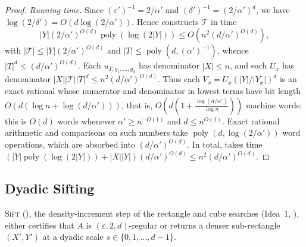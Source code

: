 \documentclass[11pt]{article}
\theoremstyle{definition}
\renewcommand{\label}[1]{}%
\newcommand{\poly}{\operatorname{poly}}
\newcommand{\abs}[1]{\left\lvert #1 \right\rvert}
\newcommand{\Sift}{\textnormal{\textsc{Sift}}}
\begin{document}
\begin{proof}
\emph{Running time.} Since $(\varepsilon')^{-1} = 2/\alpha'$ and $(\delta')^{-1} = (2/\alpha')^d$, we have $\log(2/\delta') = O(d\log(2/\alpha'))$. Hence  constructs $\mathcal{T}$ in time
\[
    \abs{Y}(2/\alpha')^{O(d)}\poly(\log(2\abs{Y})) \le O\!\left(n^2(d/\alpha')^{O(d)}\right),
\]
with $\abs{\mathcal{T}} \le \abs{Y}(2/\alpha')^{O(d)}$ and $\abs{T} \le \poly(d, (\alpha')^{-1})$, whence $\abs{T}^d \le (d/\alpha')^{O(d)}$. Each $u_{T, y_1, \dots, y_d}$ has denominator $\abs{X} \le n$, and each $U_x$ has denominator $\abs{X}\abs{\mathcal{T}}\abs{T}^d \le n^2(d/\alpha')^{O(d)}$. Thus each $V_x = U_x(\abs{Y}/\abs{Y_x})^d$ is an exact rational whose numerator and denominator in lowest terms have bit length $O(d(\log n + \log(d/\alpha')))$, that is, $O(d(1 + \frac{\log(d/\alpha')}{\log n}))$ machine words; this is $O(d)$ words whenever $\alpha' \ge n^{-O(1)}$ and $d \le n^{O(1)}$. Exact rational arithmetic and comparisons on such numbers take $\poly(d, \log(2/\alpha'))$ word operations, which are absorbed into $(d/\alpha')^{O(d)}$. In total,  takes time $(\abs{Y}\poly(\log(2\abs{Y})) + \abs{X}\abs{Y})(d/\alpha')^{O(d)} \le n^2(d/\alpha')^{O(d)}$.
\end{proof}

\subsection{Dyadic Sifting}
\label{sec:2d-sift}

\Sift{} (), the density-increment step of the rectangle and cube searches (Idea~1, ), either certifies that $A$ is $(\varepsilon, 2, d)$-regular or returns a denser sub-rectangle $(X', Y')$ at a dyadic scale $s \in \{0, 1, \dots, d-1\}$.
\end{document}
